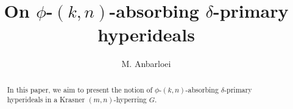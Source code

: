 \documentclass[preprint,review,10pt]{amsart}
\theoremstyle{definition}
\theoremstyle{remark}
\numberwithin{equation}{section}
\begin{document}
\title{On $\phi$-$(k,n)$-absorbing $\delta$-primary hyperideals
  }

\author{M. Anbarloei}
\address{Department of Mathematics, Faculty of Sciences,
Imam Khomeini International University, Qazvin, Iran.
}








\begin{abstract}
In this paper, we aim to present the notion of  $\phi$-$(k,n)$-absorbing $\delta$-primary hyperideals in a Krasner $(m,n)$-hyperring $G$. 
\end{abstract}
\maketitle
\end{document}
